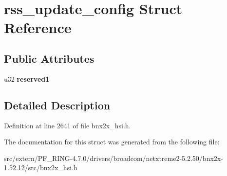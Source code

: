 \hypertarget{structrss__update__config}{
\section{rss\_\-update\_\-config Struct Reference}
\label{structrss__update__config}
}
\subsection*{Public Attributes}
\begin{DoxyCompactItemize}
\item 
\hypertarget{structrss__update__config_aeefdef26f912412e2d21fb56a3f12e66}{
u32 {\bfseries reserved1}}
\label{structrss__update__config_aeefdef26f912412e2d21fb56a3f12e66}

\end{DoxyCompactItemize}


\subsection{Detailed Description}


Definition at line 2641 of file bnx2x\_\-hsi.h.



The documentation for this struct was generated from the following file:\begin{DoxyCompactItemize}
\item 
src/extern/PF\_\-RING-\/4.7.0/drivers/broadcom/netxtreme2-\/5.2.50/bnx2x-\/1.52.12/src/bnx2x\_\-hsi.h\end{DoxyCompactItemize}
